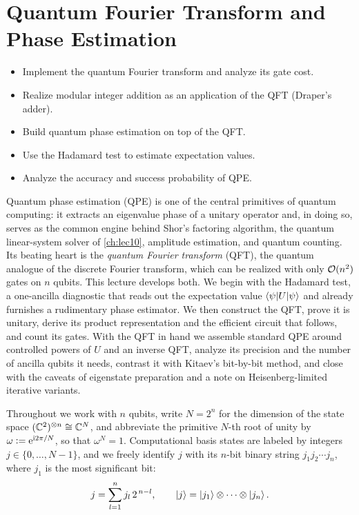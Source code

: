 \chapter{Quantum Fourier Transform and Phase Estimation}
\label{ch:lec04}

\begin{objectives}
\begin{itemize}[leftmargin=1.4em,nosep]
  \item Implement the quantum Fourier transform and analyze its gate cost.
  \item Realize modular integer addition as an application of the QFT (Draper's adder).
  \item Build quantum phase estimation on top of the QFT.
  \item Use the Hadamard test to estimate expectation values.
  \item Analyze the accuracy and success probability of QPE.
\end{itemize}
\end{objectives}


Quantum phase estimation (QPE) is one of the central primitives of quantum
computing: it extracts an eigenvalue phase of a unitary operator and, in doing
so, serves as the common engine behind Shor's factoring algorithm, the quantum
linear-system solver of \cref{ch:lec10}, amplitude estimation, and quantum
counting. Its beating heart is the \emph{quantum Fourier transform} (QFT), the
quantum analogue of the discrete Fourier transform, which can be realized with
only $\mathcal{O}(n^2)$ gates on $n$ qubits. This lecture develops both. We begin with
the Hadamard test, a one-ancilla diagnostic that reads out the expectation value
$\braket{\psi|U|\psi}$ and already furnishes a rudimentary phase estimator. We
then construct the QFT, prove it is unitary, derive its product representation
and the efficient circuit that follows, and count its gates. With the QFT in
hand we assemble standard QPE around controlled powers of $U$ and an inverse
QFT, analyze its precision and the number of ancilla qubits it needs, contrast
it with Kitaev's bit-by-bit method, and close with the caveats of eigenstate
preparation and a note on Heisenberg-limited iterative variants.

Throughout we work with $n$ qubits, write $N=2^{n}$ for the dimension of the
state space $(\mathbb{C}^2)^{\otimes n}\cong\mathbb{C}^{N}$, and abbreviate the primitive
$N$-th root of unity by $\omega\vcentcolon=\mathrm{e}^{\mathrm{i} 2\pi/N}$, so that $\omega^{N}=1$.
Computational basis states are labeled by integers $j\in\{0,\dots,N-1\}$, and we
freely identify $j$ with its $n$-bit binary string $j_1 j_2\cdots j_n$, where
$j_1$ is the most significant bit:
\[
  j=\sum_{l=1}^{n} j_l\, 2^{\,n-l},
  \qquad \ket{j}=\ket{j_1}\otimes\cdots\otimes\ket{j_n}.
\]

